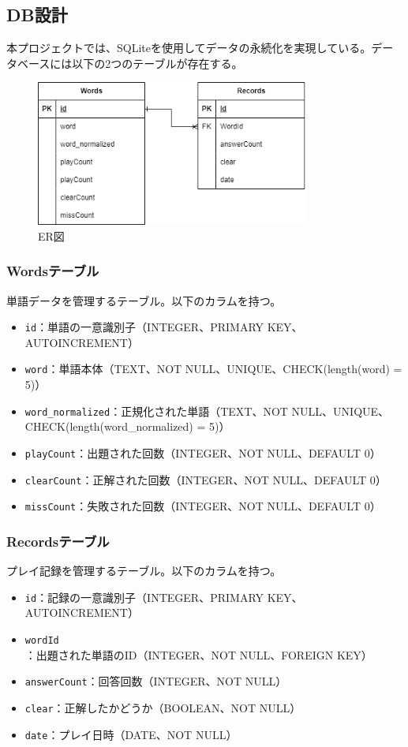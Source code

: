\documentclass[a4j]{ujarticle}
\begin{document}
\subsection{DB設計}
本プロジェクトでは、SQLiteを使用してデータの永続化を実現している。データベースには以下の2つのテーブルが存在する。

\begin{figure}[h]
\centering
\includegraphics[width=0.8\textwidth]{er.png}
\caption{ER図}
\label{fig:er}
\end{figure}

\subsubsection{Wordsテーブル}
単語データを管理するテーブル。以下のカラムを持つ。
\begin{itemize}
  \item \texttt{id}：単語の一意識別子（INTEGER、PRIMARY KEY、AUTOINCREMENT）
  \item \texttt{word}：単語本体（TEXT、NOT NULL、UNIQUE、CHECK(length(word) = 5)）
  \item \texttt{word\_normalized}：正規化された単語（TEXT、NOT NULL、UNIQUE、CHECK(length(word\_normalized) = 5)）
  \item \texttt{playCount}：出題された回数（INTEGER、NOT NULL、DEFAULT 0）
  \item \texttt{clearCount}：正解された回数（INTEGER、NOT NULL、DEFAULT 0）
  \item \texttt{missCount}：失敗された回数（INTEGER、NOT NULL、DEFAULT 0）
\end{itemize}

\subsubsection{Recordsテーブル}
プレイ記録を管理するテーブル。以下のカラムを持つ。
\begin{itemize}
  \item \texttt{id}：記録の一意識別子（INTEGER、PRIMARY KEY、AUTOINCREMENT）
  \item \texttt{wordId}：出題された単語のID（INTEGER、NOT NULL、FOREIGN KEY）
  \item \texttt{answerCount}：回答回数（INTEGER、NOT NULL）
  \item \texttt{clear}：正解したかどうか（BOOLEAN、NOT NULL）
  \item \texttt{date}：プレイ日時（DATE、NOT NULL）
\end{itemize}
\end{document}
